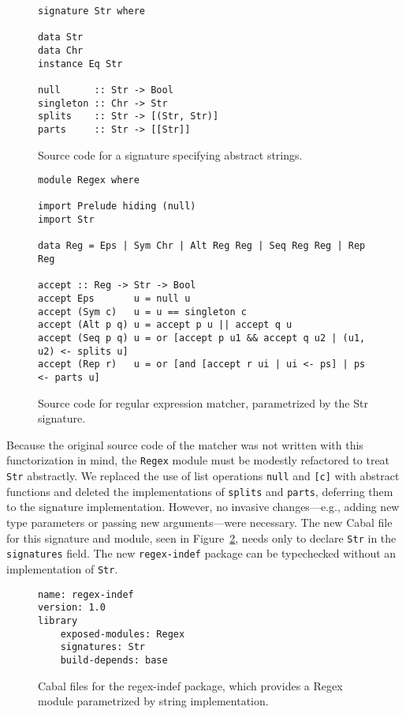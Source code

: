 \begin{figure}
\begin{lstlisting}
signature Str where

data Str
data Chr
instance Eq Str

null      :: Str -> Bool
singleton :: Chr -> Str
splits    :: Str -> [(Str, Str)]
parts     :: Str -> [[Str]]
\end{lstlisting}
\caption{Source code for a signature specifying abstract strings.}

\begin{lstlisting}
module Regex where

import Prelude hiding (null)
import Str

data Reg = Eps | Sym Chr | Alt Reg Reg | Seq Reg Reg | Rep Reg

accept :: Reg -> Str -> Bool
accept Eps       u = null u
accept (Sym c)   u = u == singleton c
accept (Alt p q) u = accept p u || accept q u
accept (Seq p q) u = or [accept p u1 && accept q u2 | (u1, u2) <- splits u]
accept (Rep r)   u = or [and [accept r ui | ui <- ps] | ps <- parts u]
\end{lstlisting}
\caption{Source code for regular expression matcher, parametrized by the Str signature.}
\label{fig:matcher-regex-indef-source}
\end{figure}

Because the original source code of the matcher was not written with
this functorization in mind, the \verb|Regex| module must be modestly
refactored to treat \verb|Str| abstractly.  We replaced the
use of list operations \verb|null| and \verb|[c]| with abstract
functions and deleted the implementations of \verb|splits| and
\verb|parts|, deferring them to the signature implementation.  However,
no invasive changes---e.g., adding new type parameters or passing new
arguments---were necessary.  The new Cabal file for this signature and
module, seen in Figure~\ref{fig:matcher-regex-indef-cabal}, needs only
to declare \verb|Str| in the \verb|signatures| field.
The new \verb|regex-indef| package can be typechecked without an
implementation of \verb|Str|.

\begin{figure}
\begin{lstlisting}[language=Cabal]
name: regex-indef
version: 1.0
library
    exposed-modules: Regex
    signatures: Str
    build-depends: base
\end{lstlisting}
\caption{Cabal files for the regex-indef package, which provides a Regex
module parametrized by string implementation.}
\label{fig:matcher-regex-indef-cabal}
\end{figure}

